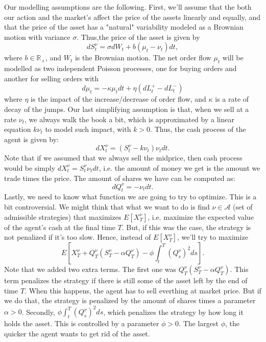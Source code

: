 Our modelling assumptions are the following.
First, we'll assume that the both our action and the market's affect the price
of the assets linearly and equally,
and that the price of the asset has a "natural" variability modeled as a
Brownian motion with variance $\sigma$. Thus,the price of the asset is given by
\begin{displaymath}
	dS^\nu_t = \sigma dW_t + b(\mu_t - \nu_t)dt,
\end{displaymath}
where $b \in \mathbb R_+$, and $W_t$ is the Brownian motion.
The net order flow $\mu_t$ will be modelled as two independent Poisson processes,
one for buying orders and another for selling orders with
\begin{displaymath}
	d\mu_t = -\kappa \mu_t dt + \eta (dL_t^+ - dL_t^-)
\end{displaymath}
where $\eta$ is the impact of the increase/decrease of order flow,
and $\kappa$ is a rate of decay of the jumps.
Our last simplifying assumption is that, when we sell at a rate $\nu_t$,
we always walk the book a bit, which
is approximated by a linear equation $k \nu_t$ to model such impact,
with $k>0$. Thus, the cash process of the agent is given by:
\begin{displaymath}
	d X_t^\nu = (S^\nu_t - k \nu_t) \nu_t dt.
\end{displaymath}
Note that if we assumed that we always sell the midprice,
then cash process would be simply $dX_t^\nu = S_t^\nu \nu_t dt$, i.e. the amount
of money we get is the amount we trade times the price. The amount of shares we have can be computed as:
\begin{displaymath}
	dQ_t^\nu = - \nu_t dt.
\end{displaymath}
Lastly, we need to know what function we are going to try to optimize.
This is a bit controversial. We might
think that what we want to do is find $\nu \in \mathcal A$ (set of admissible strategies)
that maximizes $E[X^\nu_T]$, i.e. maximize the expected value of the agent's
cash at the final time $T$.
But, if this was the case, the strategy
is not penalized if it's too slow. Hence, instead of $E[X^\nu_T]$, we'll try to maximize
\begin{displaymath}
	E\left[X^\nu_T + Q_T^\nu(S^\nu_T - \alpha Q^\nu_T) - \phi \int_t^T (Q^\nu_s)^2 ds\right].
\end{displaymath}
Note that we added two extra terms.
The first one was $Q_T^\nu(S^\nu_T - \alpha Q^\nu_T)$. This term penalizes
the strategy if there is still some of the asset left by the end of time $T$.
When this happens, the agent has to sell everthing at market price.
But if we do that, the strategy is penalized by the amount of shares times
a parameter $\alpha > 0$.
Secondly,  $\phi \int_t^T (Q^\nu_s)^2 ds$, which penalizes the strategy by how long it holds the asset.
This is controlled by a parameter $\phi>0$.
The largest $\phi$, the quicker the agent wants to get rid of the asset.

